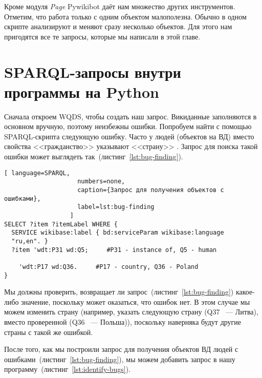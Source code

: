 
Кроме модуля \textit{Page} Pywikibot даёт нам множество других инструментов. Отметим, что работа только с одним объектом малополезна. Обычно в одном скрипте анализируют и меняют сразу несколько объектов. Для этого нам пригодятся все те запросы, которые мы написали в этой главе.

\section{SPARQL-запросы внутри программы на Python}
\label{sec:running queries}

Сначала откроем WQDS, чтобы создать наш запрос. Викиданные заполняются в основном вручную, поэтому неизбежны ошибки. Попробуем найти с помощью SPARQL-скрипта следующую ошибку. Часто у людей (объектов на ВД) вместо свойства <<гражданство>>  указывают <<страну>> .
Запрос для поиска такой ошибки может выглядеть так~(листинг~\ref{lst:bug-finding}).

\begin{lstlisting}[ language=SPARQL,
                    numbers=none,
                    caption={Запрос для получения объектов с ошибками},
                    label=lst:bug-finding
                  ]
SELECT ?item ?itemLabel WHERE {
  SERVICE wikibase:label { bd:serviceParam wikibase:language 
  "ru,en". }
  ?item 'wdt:P31 wd:Q5;     #P31 - instance of, Q5 - human
    
    'wdt:P17 wd:Q36.     #P17 - country, Q36 - Poland
}
\end{lstlisting}       

Мы должны проверить, возвращает ли запрос~(листинг~\ref{lst:bug-finding}) какое-либо значение, поскольку может оказаться, что ошибок нет. В этом случае мы можем изменить страну (например, указать следующую страну (Q37 ~--- Литва), вместо проверенной (Q36 ~--- Польша)), поскольку наверняка будут другие страны с такой же ошибкой.

После того, как мы построили запрос для получения объектов ВД людей с ошибками~(листинг~\ref{lst:bug-finding}), мы можем добавить запрос в нашу программу~(листинг~\ref{lst:identify-bugs}).

